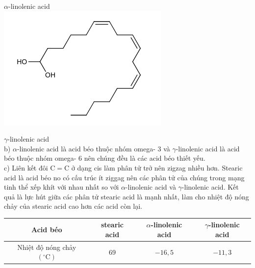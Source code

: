 \documentclass[10pt]{article}
\begin{document}
$\alpha$-linolenic acid\\
\includegraphics{smile-906eea08d16f2b61beb45066cae3e350f06241a7}

$\gamma$-linolenic acid\\
b) $\alpha$-linolenic acid là acid béo thuộc nhóm omega- 3 và $\gamma$-linolenic acid là acid béo thuộc nhóm omega- 6 nên chúng đều là các acid béo thiết yếu.\\
c) Liên kết đôi $\mathrm{C}=\mathrm{C}$ ở dạng cis làm phân tử trở nên zigzag nhiều hơn. Stearic acid là acid béo no có cấu trúc ít ziggag nên các phân tử của chúng trong mạng tinh thể xếp khít với nhau nhất so với $\alpha$-linolenic acid và $\gamma$-linolenic acid. Kết quả là lực hút giữa các phân tử stearic acid là mạnh nhất, làm cho nhiệt độ nóng chảy của stearic acid cao hơn các acid còn lại.

\begin{center}
\begin{tabular}{|c|c|c|c|}
\hline
Acid béo & stearic acid & $\alpha$-linolenic acid & $\gamma$-linolenic acid \\
\hline
Nhiệt độ nóng chảy $\left({ }^{\circ} \mathrm{C}\right)$ & 69 & $-16,5$ & $-11,3$ \\
\hline
\end{tabular}
\end{center}
\end{document}
